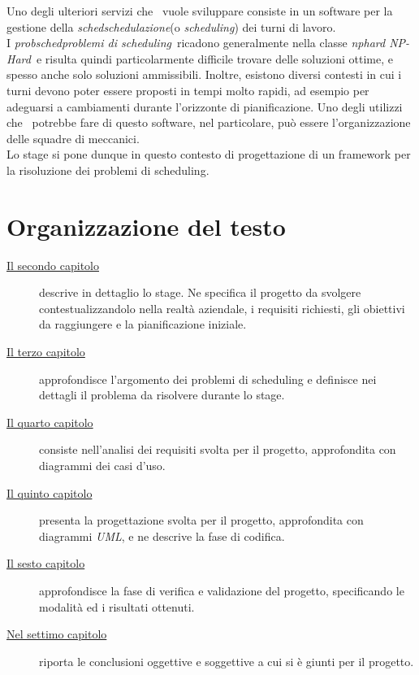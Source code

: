 Uno degli ulteriori servizi che \TS\ vuole sviluppare consiste in un software per la gestione della \emph{\gls{sched}schedulazione}\glsfirstoccur (o \textit{scheduling}) dei turni di lavoro. \\ I \emph{\gls{probsched}problemi di scheduling}\glsfirstoccur\ ricadono generalmente nella classe \emph{\gls{nphard} NP-Hard}\glsfirstoccur\ e risulta quindi particolarmente difficile trovare delle soluzioni ottime, e spesso anche solo soluzioni ammissibili. Inoltre, esistono diversi contesti in cui i turni devono poter essere proposti in tempi molto rapidi, ad esempio per adeguarsi a cambiamenti durante l’orizzonte di pianificazione. Uno degli utilizzi che \TS\ potrebbe fare di questo software, nel particolare, può essere l'organizzazione delle squadre di meccanici. \\
Lo stage si pone dunque in questo contesto di progettazione di un framework per la risoluzione dei problemi di scheduling.

\section{Organizzazione del testo}

\begin{description}
    \item[{\hyperref[cap:descrizione-stage]{Il secondo capitolo}}] descrive in dettaglio lo stage. Ne specifica il progetto da svolgere contestualizzandolo nella realtà aziendale, i requisiti richiesti, gli obiettivi da raggiungere e la pianificazione iniziale.
    
    \item[{\hyperref[cap:definizione-problema]{Il terzo capitolo}}] approfondisce l'argomento dei problemi di scheduling e definisce nei dettagli il problema da risolvere durante lo stage.
    
    \item[{\hyperref[cap:analisi-requisiti]{Il quarto capitolo}}] consiste nell'analisi dei requisiti svolta per il progetto, approfondita con diagrammi dei casi d'uso.
    
    \item[{\hyperref[cap:progettazione-codifica]{Il quinto capitolo}}] presenta la progettazione svolta per il progetto, approfondita con diagrammi \emph{UML}\glsfirstoccur, e ne descrive la fase di codifica.
    
    \item[{\hyperref[cap:verifica-validazione]{Il sesto capitolo}}] approfondisce la fase di verifica e validazione del progetto, specificando le modalità ed i risultati ottenuti.
    
    \item[{\hyperref[cap:conclusioni]{Nel settimo capitolo}}]
    riporta le conclusioni oggettive e soggettive a cui si è giunti per il progetto.
\end{description}

